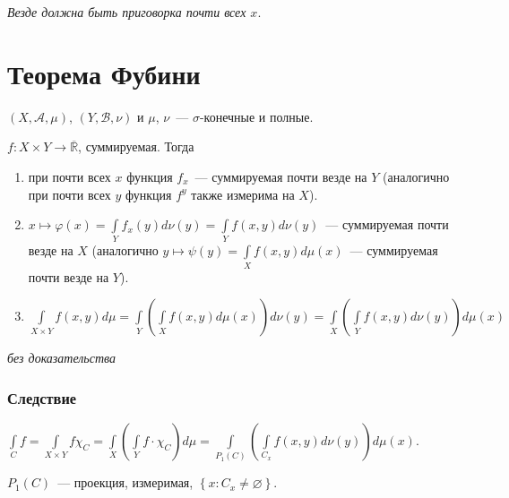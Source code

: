 \documentclass{article}
\begin{document}
        \textit{Везде должна быть приговорка  почти всех $x$\grqq }.
        
    \newpage
    
    \section{Теорема Фубини}
    
        $(X, \mathcal{A}, \mu)$, $(Y, \mathcal{B}, \nu)$ и $\mu$, $\nu$~--- $\sigma$-конечные и полные.
        
        $f : X \times Y \rightarrow \overline{\mathbb{R}}$, суммируемая. Тогда
        
        \begin{enumerate}
        
            \item при почти всех $x$ функция $f_x$~--- суммируемая почти везде на $Y$ (аналогично при почти всех $y$ функция $f^y$ также измерима на $X$).
            
            \item $x \mapsto \varphi(x) = \int\limits_Y f_x(y) d \nu (y) = \int\limits_Y f(x, y) d \nu (y)$~--- суммируемая почти везде на $X$ (аналогично $y \mapsto \psi(y) = \int\limits_X f(x, y) d \mu(x)$~--- суммируемая почти везде на $Y$).
            
            \item $\int\limits_{X \times Y} f(x, y) d \mu = \int\limits_{Y} \left( \int\limits_{X} f (x, y) d \mu (x) \right) d \nu (y) = \int\limits_X \left( \int\limits_Y f(x, y) d \nu (y) \right) d \mu (x)$
            
        \end{enumerate}
        
        \textit{без доказательства} 
    
        \subsubsection{Следствие}
        
            $\int\limits_C f = \int\limits_{X \times Y} f \chi_C = \int\limits_X \left( \int\limits_Y f \cdot \chi_C \right) d \mu = \int\limits_{P_1(C)} \left( \int\limits_{C_x} f(x, y) d \nu(y) \right) d \mu (x)$.
            
            $P_1(C)$~--- проекция, измеримая, $\left\{ x : C_x \neq \varnothing \right\}$.
    
    \newpage
    
\end{document}
